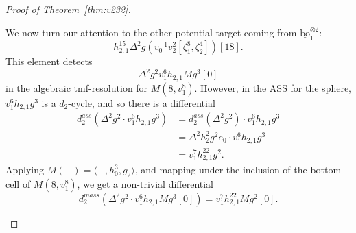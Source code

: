 \documentclass[10pt]{amsart}
\newcommand{\ul}[1]{\underline{#1}}
\newcommand{\bra}[1]{\langle #1 \rangle}
\newcommand{\bo}{\mathrm{bo}}
\newcommand{\bou}{\ul{\bo}}
\theoremstyle{definition}
\numberwithin{equation}{section}
\numberwithin{figure}{section}
\begin{document}
\begin{proof}[Proof of Theorem~\ref{thm:v232}]
\begin{description}
$$ \quad $$
We now turn our attention to the other potential target coming from $\bou_1^{\otimes 2}$:
$$ h_{2,1}^{15} \Delta^2 g (v_0^{-1}v_2^2[\zeta_1^8,\zeta_2^4])[18]. $$
This element detects
$$ \Delta^2g^2 v_1^6 h_{2,1} Mg^3[0] $$
in the algebraic tmf-resolution for $M(8,v_1^8)$.
However, in the ASS for the sphere, $v_1^6 h_{2,1} g^3$ is a $d_2$-cycle, and so there is a differential
\begin{align*}
d^{ass}_2(\Delta^2 g^2 \cdot v_1^6 h_{2,1} g^3) 
& = d^{ass}_2(\Delta^2 g^2) \cdot v_1^6 h_{2,1} g^3 \\ 
& = \Delta^2 h_2^2 g^2 e_0 \cdot v_1^6 h_{2,1} g^3 \\
& =  v_1^7 h_{2,1}^{22} g^2.
\end{align*}
Applying $M(-) = \bra{-,h_0^3,g_2}$, and mapping under the inclusion of the bottom cell of $M(8,v_1^8)$, we get a non-trivial differential
$$ d^{mass}_2(\Delta^2 g^2 \cdot v_1^6 h_{2,1} Mg^3[0]) = v_1^7 h_{2,1}^{22} M g^2[0]. $$


\end{description}
\end{proof}
\end{document}
